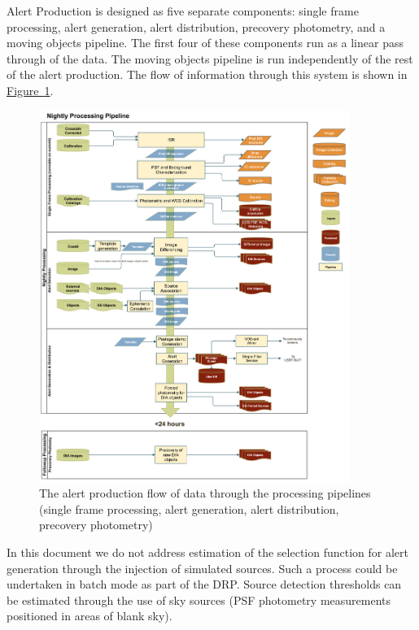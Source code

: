 Alert Production is designed as five separate components: single frame processing, alert generation, alert distribution, precovery photometry, and a moving objects pipeline. The first four of these components run as a linear pass through of the data. The moving objects pipeline is run independently of the rest of the alert production. The flow of information through this system is shown in \hyperref[fig:nightly]{Figure~\ref{fig:nightly}}.

\begin{figure}[h]
\begin{center}
\includegraphics[width=0.9\textwidth]{figures/LDM-151_Nightly_Overview.png}
\caption{\label{fig:nightly} The alert production flow of data through the processing pipelines (single frame processing, alert generation,  alert distribution, precovery photometry) }
\end{center}
\end{figure}

In this document we do not address estimation of the selection function for alert generation through the injection of simulated sources. Such a process could be undertaken in batch mode as part of the DRP. Source detection thresholds can be estimated through the use of sky sources (PSF photometry measurements positioned in areas of blank sky).

